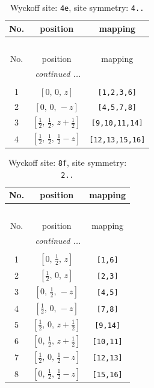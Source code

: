 \documentclass[fleqn,8pt]{jsarticle}
\begin{document}
\renewcommand{\arraystretch}{1.2}
\begin{longtable}{ccc}
\caption{Wyckoff site: {\tt 4e}, site symmetry: {\tt 4..}}
 \\
 \hline \hline
No. & position & mapping \\ \hline \endfirsthead

\multicolumn{2}{l}{\tablename\ \thetable{}} \\
 \hline \hline
No. & position & mapping \\ \hline \endhead

 \hline \hline
\multicolumn{2}{r}{\footnotesize\it continued ...} \\ \endfoot

 \hline \hline
\multicolumn{2}{r}{} \\ \endlastfoot

1 & $\left[ 0,\, 0,\, z \right]$ & {\tt [1,2,3,6]} \\ \hline
2 & $\left[ 0,\, 0,\, - z \right]$ & {\tt [4,5,7,8]} \\ \hline
3 & $\left[ \frac{1}{2},\, \frac{1}{2},\, z + \frac{1}{2} \right]$ & {\tt [9,10,11,14]} \\ \hline
4 & $\left[ \frac{1}{2},\, \frac{1}{2},\, \frac{1}{2} - z \right]$ & {\tt [12,13,15,16]} \\
\end{longtable}
\renewcommand{\arraystretch}{1.2}
\begin{longtable}{ccc}
\caption{Wyckoff site: {\tt 8f}, site symmetry: {\tt 2..}}
 \\
 \hline \hline
No. & position & mapping \\ \hline \endfirsthead

\multicolumn{2}{l}{\tablename\ \thetable{}} \\
 \hline \hline
No. & position & mapping \\ \hline \endhead

 \hline \hline
\multicolumn{2}{r}{\footnotesize\it continued ...} \\ \endfoot

 \hline \hline
\multicolumn{2}{r}{} \\ \endlastfoot

1 & $\left[ 0,\, \frac{1}{2},\, z \right]$ & {\tt [1,6]} \\ \hline
2 & $\left[ \frac{1}{2},\, 0,\, z \right]$ & {\tt [2,3]} \\ \hline
3 & $\left[ 0,\, \frac{1}{2},\, - z \right]$ & {\tt [4,5]} \\ \hline
4 & $\left[ \frac{1}{2},\, 0,\, - z \right]$ & {\tt [7,8]} \\ \hline
5 & $\left[ \frac{1}{2},\, 0,\, z + \frac{1}{2} \right]$ & {\tt [9,14]} \\ \hline
6 & $\left[ 0,\, \frac{1}{2},\, z + \frac{1}{2} \right]$ & {\tt [10,11]} \\ \hline
7 & $\left[ \frac{1}{2},\, 0,\, \frac{1}{2} - z \right]$ & {\tt [12,13]} \\ \hline
8 & $\left[ 0,\, \frac{1}{2},\, \frac{1}{2} - z \right]$ & {\tt [15,16]} \\
\end{longtable}
\end{document}
